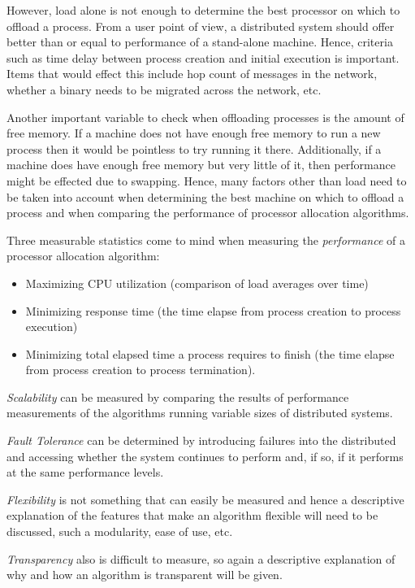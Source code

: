 \documentclass{article}
\begin{document}
However, load alone is not enough to determine the best processor on which
to offload a process.  From a user point of view, a distributed system
should offer better than or equal to performance of a stand-alone machine.
Hence, criteria such as time delay between process creation and initial
execution is important.  Items that would effect this include hop count of
messages in the network, whether a binary needs to be migrated across the
network, etc. 

Another important variable to check when offloading processes is the amount
of free memory.  If a machine does not have enough free memory to run a new
process then it would be pointless to try running it there.  Additionally,
if a machine does have enough free memory but very little of it, then
performance might be effected due to swapping.  Hence, many factors other
than load need to be taken into account when determining the best machine on
which to offload a process and when comparing the performance of processor
allocation algorithms.


Three measurable statistics come to mind when measuring the
\emph{performance} of a processor allocation algorithm:

\begin{itemize}
	\item Maximizing CPU utilization (comparison of load averages 
	over time)
        \item Minimizing response time (the time elapse from process
        creation to process execution)
        \item Minimizing total elapsed time a process requires to finish
        (the time elapse from process creation to process termination).
\end{itemize}

\emph{Scalability} can be measured by comparing the results of performance
measurements of the algorithms running variable sizes of distributed
systems.

\emph{Fault Tolerance} can be determined by introducing failures into the
distributed and accessing whether the system continues to perform and, if
so, if it performs at the same performance levels.

\emph{Flexibility} is not something that can easily be measured and hence a
descriptive explanation of the features that make an algorithm flexible will
need to be discussed, such a modularity, ease of use, etc.

\emph{Transparency} also is difficult to measure, so again a descriptive
explanation of why and how an algorithm is transparent will be given.
\end{document}

